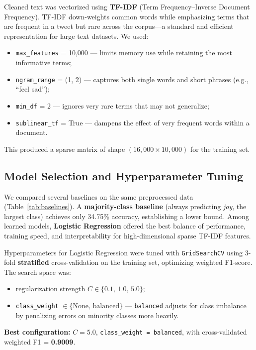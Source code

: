\documentclass[12pt]{article}
\begin{document}
Cleaned text was vectorized using \textbf{TF-IDF} (Term Frequency--Inverse Document Frequency).
TF-IDF down-weights common words while emphasizing terms that are frequent in a tweet but rare across the corpus---a standard and efficient representation for large text datasets.
We used:
\begin{itemize}
    \item \texttt{max\_features} = 10{,}000 --- limits memory use while retaining the most informative terms;
    \item \texttt{ngram\_range} = (1, 2) --- captures both single words and short phrases (e.g., ``feel sad'');
    \item \texttt{min\_df} = 2 --- ignores very rare terms that may not generalize;
    \item \texttt{sublinear\_tf} = True --- dampens the effect of very frequent words within a document.
\end{itemize}

This produced a sparse matrix of shape $(16{,}000 \times 10{,}000)$ for the training set.

\subsection{Model Selection and Hyperparameter Tuning}

We compared several baselines on the same preprocessed data (Table~\ref{tab:baselines}).
A \textbf{majority-class baseline} (always predicting \textit{joy}, the largest class) achieves only 34.75\% accuracy, establishing a lower bound.
Among learned models, \textbf{Logistic Regression} offered the best balance of performance, training speed, and interpretability for high-dimensional sparse TF-IDF features.

Hyperparameters for Logistic Regression were tuned with \texttt{GridSearchCV} using 3-fold \textbf{stratified} cross-validation on the training set, optimizing weighted F1-score.
The search space was:
\begin{itemize}
    \item regularization strength $C \in \{0.1,\, 1.0,\, 5.0\}$;
    \item \texttt{class\_weight} $\in \{\text{None},\, \text{balanced}\}$ --- \texttt{balanced} adjusts for class imbalance by penalizing errors on minority classes more heavily.
\end{itemize}

\textbf{Best configuration:} $C = 5.0$, \texttt{class\_weight = balanced}, with cross-validated weighted F1 = \textbf{0.9009}.
\end{document}
